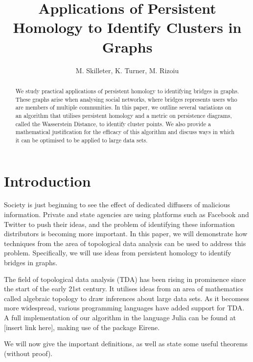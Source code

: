 \documentclass[12pt,a4paper]{amsart}
\numberwithin{equation}{section}
\theoremstyle{plain}
\theoremstyle{definition}
\begin{document}
\title{Applications of Persistent Homology to Identify Clusters in Graphs }


\author[]{M. Skilleter, K. Turner, M. Rizoiu}

\address{Australian National University \\ Mathematical Sciences Institute} 


\begin{abstract} We study practical applications of persistent homology to identifying bridges in graphs. These graphs arise when analysing social networks, where bridges represents users who are members of multiple communities. In this paper, we outline several variations on an algorithm that utilises persistent homology and a metric on persistence diagrams, called the Wasserstein Distance, to identify cluster points. We also provide a mathematical justification for the efficacy of this algorithm and discuss ways in which it can be optimised to be applied to large data sets.
\end{abstract}

\maketitle

\section{Introduction} Society is just beginning to see the effect of dedicated diffusers of malicious information. Private and state agencies are using platforms such as Facebook and Twitter to push their ideas, and the problem of identifying these information distributors is becoming more important. In this paper, we will demonstrate how techniques from the area of topological data analysis can be used to address this problem. Specifically, we will use ideas from persistent homology to identify bridges in graphs.

The field of topological data analysis (TDA) has been rising in prominence since the start of the early 21st century. It utilises ideas from an area of mathematics called algebraic topology to draw inferences about large data sets. As it becomess more widespread, various programming languages have added support for TDA. A full implementation of our algorithm in the language Julia can be found at [insert link here], making use of the package Eirene.

We will now give the important definitions, as well as state some useful theorems (without proof).
\end{document}
